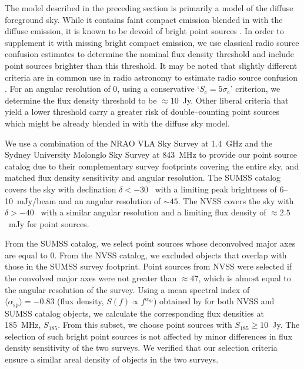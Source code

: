 \documentclass[preprint2,iop,numberedappendix]{emulateapj}
\begin{document}
The model described in the preceding section is primarily a model of the diffuse foreground sky. While it contains faint compact emission blended in with the diffuse emission, it is known to be devoid of bright point sources \citep{deo08}. In order to supplement it with missing bright compact emission, we use classical radio source confusion estimates to determine the nominal flux density threshold and include point sources brighter than this threshold. It may be noted that slightly different criteria are in common use in radio astronomy to estimate radio source confusion \citep[see Appendix of][and references therein]{thy13}. For an angular resolution of 0, using a conservative `$S_\textrm{c}=5\sigma_\textrm{c}$' criterion, we determine the flux density threshold to be $\approx 10$~Jy. Other liberal criteria that yield a lower threshold carry a greater risk of double--counting point sources which might be already blended in with the diffuse sky model. 

We use a combination of the NRAO VLA Sky Survey \citep[NVSS;][]{con98} at 1.4~GHz and the Sydney University Molonglo Sky Survey \citep[SUMSS;][]{boc99,mau03} at 843~MHz to provide our point source catalog due to their complementary survey footprints covering the entire sky, and matched flux density sensitivity and angular resolution. The SUMSS catalog covers the sky with declination $\delta < -30$\arcdeg~ with a limiting peak brightness of 6--10~mJy/beam and an angular resolution of $\sim 45$\arcsec. The NVSS covers the sky with $\delta > -40$\arcdeg~ with a similar angular resolution and a limiting flux density of $\approx 2.5$~mJy for point sources. 

From the SUMSS catalog, we select point sources whose deconvolved major axes are equal to 0\arcsec. From the NVSS catalog, we excluded objects that overlap with those in the SUMSS survey footprint. Point sources from NVSS were selected if the convolved major axes were not greater than $\approx 47$\arcsec, which is almost equal to the angular resolution of the survey. Using a mean spectral index of $\langle\alpha_\textrm{sp}\rangle=-0.83$ (flux density, $S(f)\propto f^{\alpha_\textrm{sp}}$) obtained by \citet{mau03} for both NVSS and SUMSS catalog objects, we calculate the corresponding flux densities at 185~MHz, $S_{185}$. From this subset, we choose point sources with $S_{185}\geq 10$~Jy. The selection of such bright point sources is not affected by minor differences in flux density sensitivity of the two surveys. We verified that our selection criteria ensure a similar areal density of objects in the two surveys. 
\end{document}
